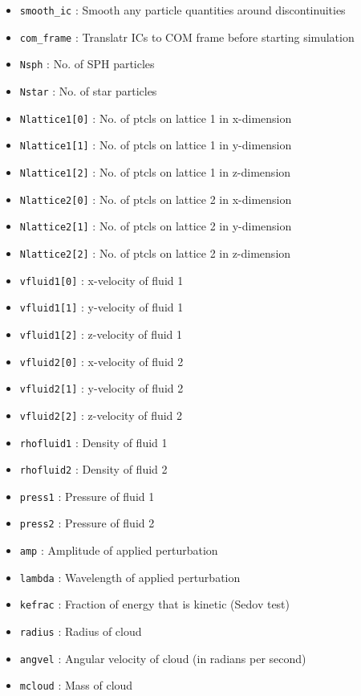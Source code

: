 \documentclass[a4paper]{article}
\newcommand{\var}[1]{\texttt{#1}}
\begin{document}
\begin{itemize}

\item \var{smooth\_ic} : Smooth any particle quantities around discontinuities

\item \var{com\_frame} : Translatr ICs to COM frame before starting simulation

\item \var{Nsph} : No. of SPH particles
\item \var{Nstar} : No. of star particles

\item \var{Nlattice1[0]} : No. of ptcls on lattice 1 in x-dimension
\item \var{Nlattice1[1]} : No. of ptcls on lattice 1 in y-dimension
\item \var{Nlattice1[2]} : No. of ptcls on lattice 1 in z-dimension
\item \var{Nlattice2[0]} : No. of ptcls on lattice 2 in x-dimension
\item \var{Nlattice2[1]} : No. of ptcls on lattice 2 in y-dimension
\item \var{Nlattice2[2]} : No. of ptcls on lattice 2 in z-dimension

\item \var{vfluid1[0]}   : x-velocity of fluid 1
\item \var{vfluid1[1]}   : y-velocity of fluid 1
\item \var{vfluid1[2]}   : z-velocity of fluid 1
\item \var{vfluid2[0]}   : x-velocity of fluid 2
\item \var{vfluid2[1]}   : y-velocity of fluid 2
\item \var{vfluid2[2]}   : z-velocity of fluid 2

\item \var{rhofluid1}    : Density of fluid 1
\item \var{rhofluid2}    : Density of fluid 2

\item \var{press1}       : Pressure of fluid 1
\item \var{press2}       : Pressure of fluid 2

\item \var{amp}          : Amplitude of applied perturbation
\item \var{lambda}       : Wavelength of applied perturbation

\item \var{kefrac}       : Fraction of energy that is kinetic (Sedov test)
\item \var{radius}       : Radius of cloud
\item \var{angvel}       : Angular velocity of cloud (in radians per second)
\item \var{mcloud}       : Mass of cloud


\end{itemize}
\end{document}
